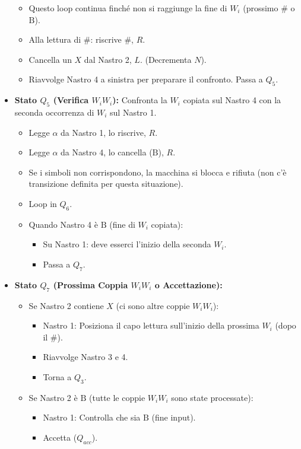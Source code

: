 \documentclass[a4paper]{article}
\newcommand{\B}{\text{B}} %
\begin{document}
\begin{itemize}
\begin{itemize}
            \item Questo loop continua finché non si raggiunge la fine di $W_i$ (prossimo $\#$ o $\B$).
            \item Alla lettura di $\#$: riscrive $\#$, $R$.
            \item Cancella un $X$ dal Nastro 2, $L$. (Decrementa $N$).
            \item Riavvolge Nastro 4 a sinistra per preparare il confronto. Passa a $Q_5$.
        \end{itemize}
    \item \textbf{Stato $Q_5$ (Verifica $W_i W_i$):}
        Confronta la $W_i$ copiata sul Nastro 4 con la seconda occorrenza di $W_i$ sul Nastro 1.
        \begin{itemize}
            \item Legge $\alpha$ da Nastro 1, lo riscrive, $R$.
            \item Legge $\alpha$ da Nastro 4, lo cancella ($\B$), $R$.
            \item Se i simboli non corrispondono, la macchina si blocca e rifiuta (non c'è transizione definita per questa situazione).
            \item Loop in $Q_6$.
            \item Quando Nastro 4 è $\B$ (fine di $W_i$ copiata):
                \begin{itemize}
                    \item Su Nastro 1: deve esserci l'inizio della seconda $W_i$.
                    \item Passa a $Q_7$.
                \end{itemize}
        \end{itemize}
    \item \textbf{Stato $Q_7$ (Prossima Coppia $W_i W_i$ o Accettazione):}
        \begin{itemize}
            \item Se Nastro 2 contiene $X$ (ci sono altre coppie $W_i W_i$):
                \begin{itemize}
                    \item Nastro 1: Posiziona il capo lettura sull'inizio della prossima $W_i$ (dopo il $\#$).
                    \item Riavvolge Nastro 3 e 4.
                    \item Torna a $Q_3$.
                \end{itemize}
            \item Se Nastro 2 è $\B$ (tutte le coppie $W_i W_i$ sono state processate):
                \begin{itemize}
                    \item Nastro 1: Controlla che sia $\B$ (fine input).
                    \item Accetta ($Q_{acc}$).
                \end{itemize}
        \end{itemize}
\end{itemize}
\end{document}
